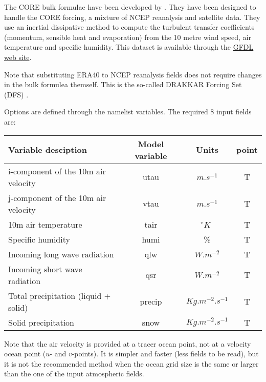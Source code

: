 \documentclass[../tex_main/NEMO_manual]{subfiles}
\begin{document}
The CORE bulk formulae have been developed by \citet{Large_Yeager_Rep04}. 
They have been designed to handle the CORE forcing, a mixture of NCEP 
reanalysis and satellite data. They use an inertial dissipative method to compute 
the turbulent transfer coefficients (momentum, sensible heat and evaporation) 
from the 10 metre wind speed, air temperature and specific humidity.
This \citet{Large_Yeager_Rep04} dataset is available through the 
\href{http://nomads.gfdl.noaa.gov/nomads/forms/mom4/CORE.html}{GFDL web site}. 

Note that substituting ERA40 to NCEP reanalysis fields 
does not require changes in the bulk formulea themself. 
This is the so-called DRAKKAR Forcing Set (DFS) \citep{Brodeau_al_OM09}. 

Options are defined through the   namelist variables.
The required 8 input fields are:

\begin{table}[htbp]   \label{tab:CORE}
\begin{center}
\begin{tabular}{|l|c|c|c|}
\hline
Variable desciption					& Model variable	& Units	 & point \\		\hline
i-component of the 10m air velocity	& utau		& $m.s^{-1}$			& T  \\ 	\hline
j-component of the 10m air velocity	& vtau		& $m.s^{-1}$			& T  \\	\hline
10m air temperature					& tair		& \r{}$K$				& T 	\\	\hline
Specific humidity					& humi		& \%					& T \\		\hline
Incoming long wave radiation		& qlw		& $W.m^{-2}$			& T \\		\hline
Incoming short wave radiation		& qsr		& $W.m^{-2}$			& T \\		\hline
Total precipitation (liquid + solid)	& precip	& $Kg.m^{-2}.s^{-1}$	& T \\ 	\hline
Solid precipitation					& snow		& $Kg.m^{-2}.s^{-1}$	& T \\	\hline
\end{tabular}
\end{center}
\end{table}

Note that the air velocity is provided at a tracer ocean point, not at a velocity ocean 
point ($u$- and $v$-points). It is simpler and faster (less fields to be read), 
but it is not the recommended method when the ocean grid size is the same 
or larger than the one of the input atmospheric fields.
\end{document}
